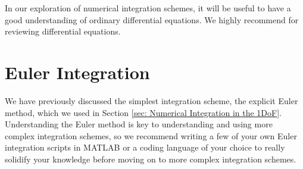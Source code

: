 \documentclass[12pt]{report}
\begin{document}
In our exploration of numerical integration schemes, it will be useful to have a good understanding of ordinary differential equations. We highly recommend \cite{dawkins_differential_2023} for reviewing differential equations.

\section{Euler Integration}
We have previously discussed the simplest integration scheme, the explicit Euler method, which we used in Section \ref{sec: Numerical Integration in the 1DoF}. Understanding the Euler method is key to understanding and using more complex integration schemes, so we recommend writing a few of your own Euler integration scripts in MATLAB or a coding language of your choice to really solidify your knowledge before moving on to more complex integration schemes. 
\end{document}
